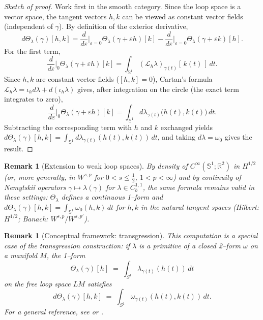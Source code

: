\documentclass{amsart}
\newcounter{thm}
\newcounter{ex}
\newcounter{re}
\newtheorem{remark}[thm]{Remark}
\begin{document}
\begin{proof}[Sketch of proof]
Work first in the smooth category. Since the loop space is a vector space,
the tangent vectors $h,k$ can be viewed as constant vector fields (independent of $\gamma$).
By definition of the exterior derivative,
\[
d\Theta_\lambda(\gamma)[h,k]
=\frac{d}{d\varepsilon}\Big|_{\varepsilon=0}\Theta_\lambda(\gamma+\varepsilon h)[k]
 -\frac{d}{d\varepsilon}\Big|_{\varepsilon=0}\Theta_\lambda(\gamma+\varepsilon k)[h].
\]
For the first term,
\[
\frac{d}{d\varepsilon}\Big|_{0}\Theta_\lambda(\gamma+\varepsilon h)[k]
=\int_{\mathbb S^1}(\mathcal L_h\lambda)_{\gamma(t)}[\,k(t)\,]\,dt.
\]
Since $h,k$ are constant vector fields ($[h,k]=0$), Cartan’s formula
$\mathcal L_h\lambda=\iota_h d\lambda + d(\iota_h\lambda)$ gives, after integration on the circle
(the exact term integrates to zero),
\[
\frac{d}{d\varepsilon}\Big|_{0}\Theta_\lambda(\gamma+\varepsilon h)[k]
=\int_{\mathbb S^1} d\lambda_{\gamma(t)}\big(h(t),k(t)\big)\,dt.
\]
Subtracting the corresponding term with $h$ and $k$ exchanged yields
$d\Theta_\lambda(\gamma)[h,k]=\int_{\mathbb S^1} d\lambda_{\gamma(t)}(h(t),k(t))\,dt$,
and taking $d\lambda=\omega_0$ gives the result.
\end{proof}

\begin{remark}[Extension to weak loop spaces]
By density of $C^\infty(\mathbb S^1;\mathbb R^2)$ in $H^{1/2}$ (or, more generally,
in $W^{s,p}$ for $0<s\le\tfrac12$, $1<p<\infty$) and by continuity of Nemytski{\u i} operators
$\gamma\mapsto\lambda(\gamma)$ for $\lambda\in C^{1,1}_b$, the same formula remains valid
in these settings: $\Theta_\lambda$ defines a continuous 1--form and
$d\Theta_\lambda(\gamma)[h,k]=\int_{\mathbb S^1}\omega_0(h,k)\,dt$
for $h,k$ in the natural tangent spaces (Hilbert: $H^{1/2}$; Banach: $W^{s,p}/W^{s,p'}$).
\end{remark}

\begin{remark}[Conceptual framework: transgression]
This computation is a special case of the \emph{transgression} construction:
if $\lambda$ is a primitive of a closed 2--form $\omega$ on a manifold $M$,
the 1--form
\[
\Theta_\lambda(\gamma)[h] \;=\; \int_{S^1}\lambda_{\gamma(t)}(h(t))\,dt
\]
on the free loop space $LM$ satisfies
\[
d\Theta_\lambda(\gamma)[h,k] \;=\; \int_{S^1}\omega_{\gamma(t)}(h(t),k(t))\,dt.
\]
For a general reference, see \cite[Chap.~2]{Brylinski1993} or
\cite[§4.7]{PressleySegal1986}.
\end{remark}
\end{document}
